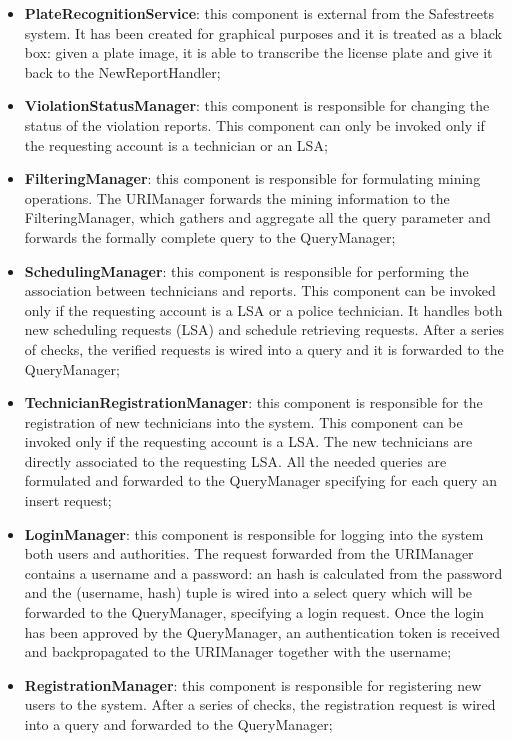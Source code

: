 \begin{itemize}
    \item \textbf{PlateRecognitionService}: this component is external from the Safestreets system. It has been created for graphical purposes and it is treated as a black box: given a plate image, it is able to transcribe the license plate and give it back to the NewReportHandler;
    \item \textbf{ViolationStatusManager}: this component is responsible for changing the status of the violation reports. This component can only be invoked only if the requesting account is a technician or an LSA;
    \item \textbf{FilteringManager}: this component is responsible for formulating mining operations. The URIManager forwards the mining information to the FilteringManager, which gathers and aggregate all the query parameter and forwards the formally complete query to the QueryManager;
    \item \textbf{SchedulingManager}: this component is responsible for performing the association between technicians and reports. This component can be invoked only if the requesting account is a LSA or a police technician. It handles both new scheduling requests (LSA) and schedule retrieving requests. After a series of checks, the verified requests is wired into a query and it is forwarded to the QueryManager;
    \item \textbf{TechnicianRegistrationManager}: this component is responsible for the registration of new technicians into the system. This component can be invoked only if the requesting account is a LSA. The new technicians are directly associated to the requesting LSA. All the needed queries are formulated and forwarded to the QueryManager specifying for each query an insert request;
    \item \textbf{LoginManager}: this component is responsible for logging into the system both users and authorities. The request forwarded from the URIManager contains a username and a password: an hash is calculated from the password and the (username, hash) tuple is wired into a select query which will be forwarded to the QueryManager, specifying a login request. Once the login has been approved by the QueryManager, an authentication token is received and backpropagated to the URIManager together with the username;
    \item \textbf{RegistrationManager}: this component is responsible for registering new users to the system. After a series of checks, the registration request is wired into a query and forwarded to the QueryManager;

\end{itemize}
